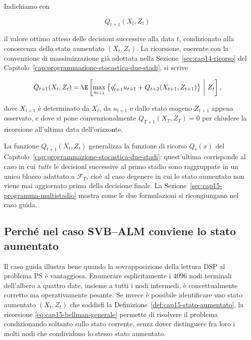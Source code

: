 Indichiamo con

\[
Q_{t+1}(X_t,Z_t)
\]

il valore ottimo atteso delle decisioni successive alla data $t$, condizionato
alla conoscenza dello stato aumentato $(X_t,Z_t)$. La ricorsione, coerente
con la convenzione di massimizzazione gi\`a adottata nella
Sezione~\ref{sec:cap14-ricorso} del Capitolo~\ref{cap:programmazione-stocastica-due-stadi},
si scrive

\begin{equation}
Q_{t+1}(X_t,Z_t)
=
\E
\left[
\max_{u_{t+1}}
\left\{
q_{t+1}'u_{t+1}
+
Q_{t+2}(X_{t+1},Z_{t+1})
\right\}
\ \middle|\
Z_t
\right],
\label{eq:cap15-bellman-generale}
\end{equation}

dove $X_{t+1}$ \`e determinato da $X_t$, da $u_{t+1}$ e dallo stato esogeno
$Z_{t+1}$ appena osservato, e dove si pone convenzionalmente
$Q_{T+1}(X_T,Z_T)=0$ per chiudere la ricorsione all'ultima data
dell'orizzonte.

\begin{remark}

La funzione $Q_{t+1}(X_t,Z_t)$ generalizza la funzione di ricorso
$Q_s(x)$ del Capitolo~\ref{cap:programmazione-stocastica-due-stadi}: quest'ultima
corrisponde al caso in cui \emph{tutte} le decisioni successive al primo
stadio sono raggruppate in un unico blocco adattato a $\mathcal F_T$, cio\`e
al caso degenere in cui lo stato aumentato non viene mai aggiornato prima
della decisione finale. La Sezione~\ref{sec:cap15-programma-multistadio}
mostra come le due formulazioni si ricongiungano nel caso guida.

\end{remark}

\subsection{Perch\'e nel caso SVB--ALM conviene lo stato aumentato}

Il caso guida illustra bene quando la sovrapposizione della lettura DSP al
problema PS \`e vantaggiosa. Enumerare esplicitamente i $4096$ nodi
terminali dell'albero a quattro date, insieme a tutti i nodi intermedi,
\`e concettualmente corretto ma operativamente pesante. Se invece \`e
possibile identificare uno stato aumentato $(X_t,Z_t)$ che soddisfi la
Definizione~\ref{def:cap15-stato-aumentato}, la ricorsione
\eqref{eq:cap15-bellman-generale} permette di risolvere il problema
condizionando soltanto sullo stato corrente, senza dover distinguere fra
loro i molti nodi che condividono lo stesso stato aumentato.

